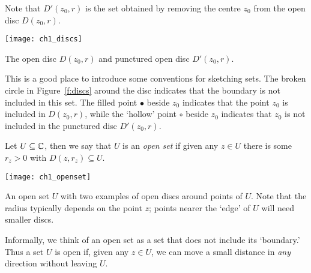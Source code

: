 Note that $D'(z_0,r)$ is the set obtained by removing the centre $z_0$ from the open disc $D(z_0,r)$.
\begin{sfig}
\texttt{[image: ch1\_discs]}
\caption{The open disc $D(z_0,r)$ and punctured open disc $D'(z_0,r)$.}
\label{f:discs}
\end{sfig}

\begin{notation}
This is a good place to introduce some conventions for sketching sets.  The broken circle in Figure~\ref{f:discs} around the disc indicates that the boundary is not included in this set.  The filled point $\bullet$ beside $z_0$ indicates that the point $z_0$ is included in $D(z_0,r)$, while the `hollow' point $\circ$ beside $z_0$ indicates that $z_0$ is not included in the punctured disc $D'(z_0,r)$.
\end{notation}


\begin{definition}
Let $U \subseteq \mathbb{C}$, then we say that $U$ is an \emph{open set} if given any $z \in U$ there is some $r_z>0$ with $D(z,r_{z}) \subseteq U$.
\end{definition}
\begin{sfig}
\texttt{[image: ch1\_openset]}
\caption{An open set $U$ with two examples of open discs around points of $U$.  Note that the radius typically depends on the point $z$; points nearer the `edge' of $U$ will need smaller discs.}
\end{sfig}
Informally, we think of an open set as a set that does not include its `boundary.'  Thus a set $U$ is open if, given any $z \in U$, we can move a small distance in \emph{any} direction without leaving $U$.


